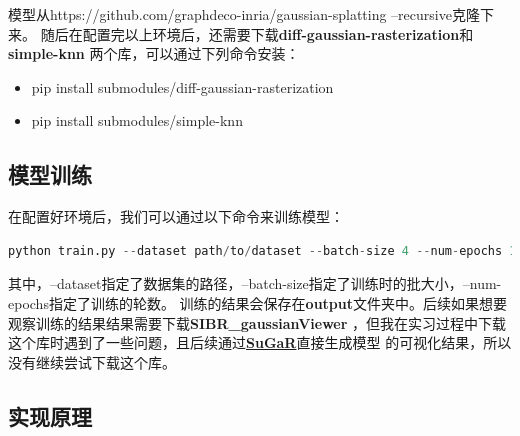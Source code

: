 \documentclass{nwputhesis}
\begin{document}
\indent
模型从{https://github.com/graphdeco-inria/gaussian-splatting --recursive}克隆下来。
随后在配置完以上环境后，还需要下载\textbf{diff-gaussian-rasterization}和\textbf{simple-knn}
两个库，可以通过下列命令安装：
\begin{itemize}
    \item pip install submodules/diff-gaussian-rasterization
    \item pip install submodules/simple-knn
\end{itemize}
\subsection{模型训练}
\indent
在配置好环境后，我们可以通过以下命令来训练模型：
\begin{lstlisting}[language=python]
    python train.py --dataset path/to/dataset --batch-size 4 --num-epochs 100
\end{lstlisting}

\indent
其中，--dataset指定了数据集的路径，--batch-size指定了训练时的批大小，--num-epochs指定了训练的轮数。
训练的结果会保存在\textbf{output}文件夹中。后续如果想要观察训练的结果结果需要下载\textbf{SIBR\_gaussianViewer}
，但我在实习过程中下载这个库时遇到了一些问题，且后续通过\textbf{\hyperlink{sugar}{SuGaR}}直接生成模型
的可视化结果，所以没有继续尝试下载这个库。\\

\subsection{实现原理}
\end{document}
